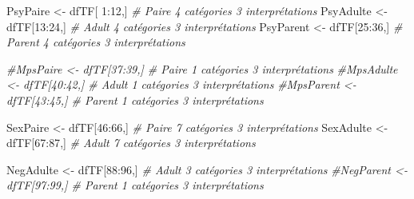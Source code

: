 \documentclass[
]{article}
\newenvironment{Shaded}{\begin{snugshade}}{\end{snugshade}}
\newcommand{\CommentTok}[1]{\textcolor[rgb]{0.56,0.35,0.01}{\textit{#1}}}
\newcommand{\DecValTok}[1]{\textcolor[rgb]{0.00,0.00,0.81}{#1}}
\newcommand{\NormalTok}[1]{#1}
\newcommand{\OtherTok}[1]{\textcolor[rgb]{0.56,0.35,0.01}{#1}}
\newcommand{\SpecialCharTok}[1]{\textcolor[rgb]{0.00,0.00,0.00}{#1}}
\begin{document}
\begin{Shaded}
\begin{Highlighting}[]
\NormalTok{PsyPaire  }\OtherTok{\textless{}{-}}\NormalTok{ dfTF[ }\DecValTok{1}\SpecialCharTok{:}\DecValTok{12}\NormalTok{,]       }\CommentTok{\# Paire  4 catégories 3 interprétations}
\NormalTok{PsyAdulte }\OtherTok{\textless{}{-}}\NormalTok{ dfTF[}\DecValTok{13}\SpecialCharTok{:}\DecValTok{24}\NormalTok{,]       }\CommentTok{\# Adult  4 catégories 3 interprétations}
\NormalTok{PsyParent }\OtherTok{\textless{}{-}}\NormalTok{ dfTF[}\DecValTok{25}\SpecialCharTok{:}\DecValTok{36}\NormalTok{,]       }\CommentTok{\# Parent 4 catégories 3 interprétations}

\CommentTok{\#MpsPaire  \textless{}{-} dfTF[37:39,]       \# Paire  1 catégories 3 interprétations}
\CommentTok{\#MpsAdulte \textless{}{-} dfTF[40:42,]       \# Adult  1 catégories 3 interprétations}
\CommentTok{\#MpsParent \textless{}{-} dfTF[43:45,]       \# Parent 1 catégories 3 interprétations}

\NormalTok{SexPaire  }\OtherTok{\textless{}{-}}\NormalTok{ dfTF[}\DecValTok{46}\SpecialCharTok{:}\DecValTok{66}\NormalTok{,]       }\CommentTok{\# Paire  7 catégories 3 interprétations}
\NormalTok{SexAdulte }\OtherTok{\textless{}{-}}\NormalTok{ dfTF[}\DecValTok{67}\SpecialCharTok{:}\DecValTok{87}\NormalTok{,]       }\CommentTok{\# Adult  7 catégories 3 interprétations}

\NormalTok{NegAdulte }\OtherTok{\textless{}{-}}\NormalTok{ dfTF[}\DecValTok{88}\SpecialCharTok{:}\DecValTok{96}\NormalTok{,]       }\CommentTok{\# Adult  3 catégories 3 interprétations}
\CommentTok{\#NegParent \textless{}{-} dfTF[97:99,]       \# Parent 1 catégories 3 interprétations}
\end{Highlighting}
\end{Shaded}
\end{document}

